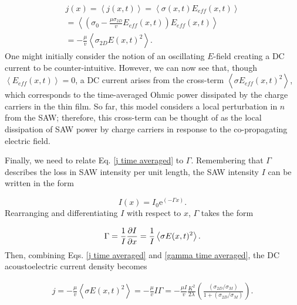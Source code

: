 \documentclass[double,12pt,1in]{beavtex}
\begin{document}
\begin{equation}
    \begin{split}
        j(x) = \left\langle j(x,t) \right\rangle = \left\langle \sigma(x,t) E_{eff}(x,t) \right\rangle \\
        = \left\langle \left( \sigma_0 - \frac{\mu \sigma_{2D}}{v}E_{eff}(x,t) \right) E_{eff}(x,t)  \right\rangle \\
        = - \frac{\mu}{v}\left\langle\sigma_{2D} E(x,t)^2\right\rangle. 
    \end{split}
    \label{j time averaged}
\end{equation}
One might initially consider the notion of an oscillating $E$-field creating a DC current to be counter-intuitive. However, we can now see that, though $\left\langle E_{eff}(x,t) \right\rangle = 0$, a DC current arises from the cross-term $\left\langle \sigma E_{eff}(x,t) ^2 \right\rangle$, which corresponds to the time-averaged Ohmic power dissipated by the charge carriers in the thin film. So far, this model considers a local perturbation in $n$ from the SAW; therefore, this cross-term can be thought of as the local dissipation of SAW power by charge carriers in response to the co-propagating electric field. 

Finally, we need to relate Eq. \ref{j time averaged} to $\Gamma$. Remembering that $\Gamma$ describes the loss in SAW intensity per unit length, the SAW intensity $I$ can be written in the form

\begin{equation}
    I(x) = I_0 \mathrm{e}^{(-\Gamma x)}.
\end{equation}
Rearranging and differentiating $I$ with respect to $x$, $\Gamma$ takes the form

\begin{equation}
    \Gamma = \frac{1}{I} \pdv{I}{x} = \frac{1}{I}\left\langle\sigma E(x,t)^2\right\rangle. \label{gamma time averaged}
\end{equation}
Then, combining Eqs. \ref{j time averaged} and \ref{gamma time averaged}, the DC acoustoelectric current density becomes

\begin{equation}
    \begin{split}
        j = - \frac{\mu}{v}\left\langle\sigma E(x,t)^2\right\rangle = - \frac{\mu}{v} I\Gamma = - \frac{\mu I}{v} \frac{K^2}{2\lambda}(\frac{(\sigma_{2D}/\sigma_M)}{1+(\sigma_{2D}/\sigma_M)}). 
    \end{split}
    \label{J_2D}
\end{equation}
\end{document}
